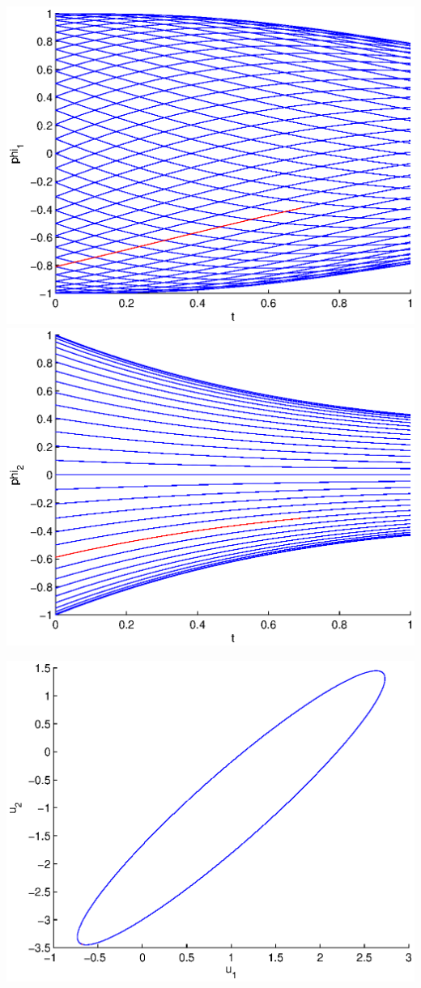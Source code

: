 \documentclass[11pt]{article}
\begin{document}
\includegraphics[scale=0.6]{pics/pic1_phi1.eps}
\includegraphics[scale=0.6]{pics/pic1_phi2.eps}

\includegraphics[scale=0.6]{pics/pic1_u.eps}
\end{document}
